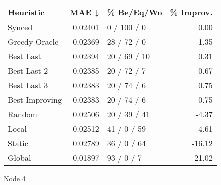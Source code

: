 \begin{tabular}{lrlr}
\toprule
\textbf{Heuristic} & \textbf{MAE ↓} & \textbf{\% Be/Eq/Wo} & \textbf{\% Improv.} \\
\midrule
            Synced &        0.02401 &          0 / 100 / 0 &                0.00 \\
     Greedy Oracle &        0.02369 &          28 / 72 / 0 &                1.35 \\
         Best Last &        0.02394 &         20 / 69 / 10 &                0.31 \\
       Best Last 2 &        0.02385 &          20 / 72 / 7 &                0.67 \\
       Best Last 3 &        0.02383 &          20 / 74 / 6 &                0.75 \\
    Best Improving &        0.02383 &          20 / 74 / 6 &                0.75 \\
            Random &        0.02506 &         20 / 39 / 41 &               -4.37 \\
             Local &        0.02512 &          41 / 0 / 59 &               -4.61 \\
            Static &        0.02789 &          36 / 0 / 64 &              -16.12 \\
            Global &        0.01897 &           93 / 0 / 7 &               21.02 \\
\bottomrule
\end{tabular}
\caption{Node 4}
\label{tab:iid_lr05_le1_bs4_4}
